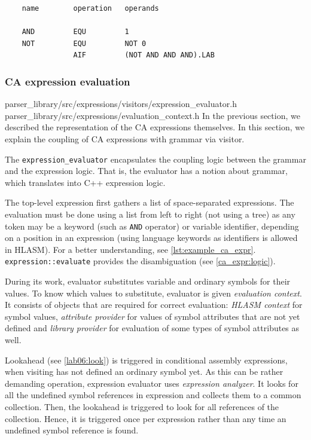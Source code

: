 \begin{listing}[t]
	\begin{verbatim}
    name        operation   operands
	
    AND         EQU         1
    NOT         EQU         NOT 0
                AIF         (NOT AND AND AND).LAB
	\end{verbatim} 
	\caption{An example of using keywords (\texttt{AND} and \texttt{NOT}) as variable names resulting in a valid expression (line 3).}
	\label{lst:example_ca_expr}
\end{listing}

\subsubsection{CA expression evaluation}
\label{ca_expr:eval}
{parser\_library/src/expressions/visitors/expression\_evaluator.h}
{parser\_library/src/expressions/evaluation\_context.h}
In the previous section, we described the representation of the CA expressions themselves. In this section, we explain the coupling of CA expressions with grammar via visitor. 

The \texttt{expression\_evaluator} encapsulates the coupling logic between the grammar and the expression logic. That is, the evaluator has a notion about grammar, which translates into C++ expression logic.

The top-level expression first gathers a list of space-separated expressions. The evaluation must be done using a list from left to right (not using a tree) as any token may be a keyword (such as \texttt{AND} operator) or variable identifier, depending on a position in an expression (using language keywords as identifiers is allowed in HLASM). For a better understanding, see \cref{lst:example_ca_expr}. \texttt{expression::evaluate} provides the disambiguation (see \cref{ca_expr:logic}). 

During its work, evaluator substitutes variable and ordinary symbols for their values. To know which values to substitute, evaluator is given \emph{evaluation context}. It consists of objects that are required for correct evaluation: \emph{HLASM context} for symbol values, \emph{attribute provider} for values of symbol attributes that are not yet defined and \emph{library provider} for evaluation of some types of symbol attributes as well.

Lookahead (see \cref{lab06:look}) is triggered in conditional assembly expressions, when visiting has not defined an ordinary symbol yet. As this can be rather demanding operation, expression evaluator uses \emph{expression analyzer}. It looks for all the undefined symbol references in expression and collects them to a common collection. Then, the lookahead is triggered to look for all references of the collection. Hence, it is triggered once per expression rather than any time an undefined symbol reference is found. 


